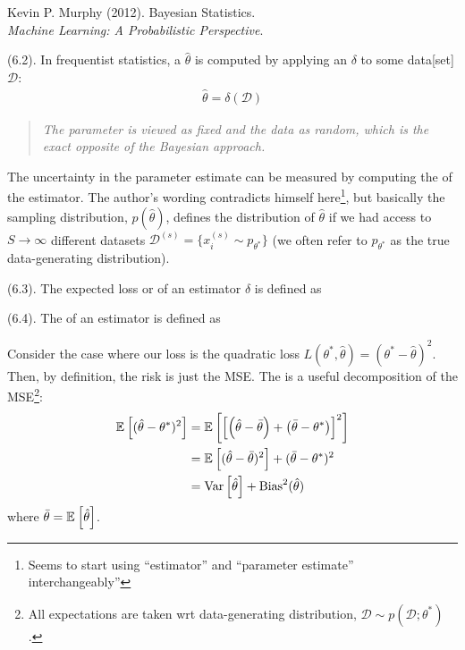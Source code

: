 \documentclass[11pt]{article}
\begin{document}

\vspace{-1.7em}
{\scriptsize Kevin P. Murphy (2012). Bayesian Statistics.\\ \textit{Machine Learning: A Probabilistic Perspective}.\\ }

 (6.2). In frequentist statistics, a  $\hat \theta$ is computed by applying an  $\delta$ to some data[set] $\mathcal D$:
\begin{align}
	\hat \theta = \delta(\mathcal D)
\end{align}
\begin{quote}
	\textit{The parameter is viewed as fixed and the data as random, which is the exact opposite of the Bayesian approach.}
\end{quote}
The uncertainty in the parameter estimate can be measured by computing the  of the estimator. The author's wording contradicts himself here\footnote{Seems to start using ``estimator'' and ``parameter estimate'' interchangeably''}, but basically the sampling distribution, $p(\hat \theta)$, defines the distribution of $\hat \theta$ if we had access to $S \rightarrow \infty$ different datasets $\mathcal{D}^{(s)} = \{x_i^{(s)} \sim p_{\theta^*}\}$ (we often refer to $p_{\theta^*}$ as the true data-generating distribution).  

 (6.3). The expected loss or  of an estimator $\delta$ is defined as


 (6.4). The  of an estimator is defined as

Consider the case where our loss is the quadratic loss $L(\theta^*, \hat{\theta}) = (\theta^* - \hat{\theta})^2$. Then, by definition, the risk is just the MSE. The  is a useful decomposition of the MSE\footnote{All expectations are taken wrt data-generating distribution, $\mathcal D \sim p(\mathcal D; \theta^*)$.}:
\begin{align}
	\mathbb{E}_{}\left[(\hat\theta -\theta^*)^2\right]
		&= \mathbb{E}_{}\left[\left[ \left(  \hat\theta - \bar\theta  \right) + \left(  \bar\theta - \theta^{*}   \right) \right]^2\right] \\
		&= \mathbb{E}_{}\left[(\hat\theta - \bar\theta)^2\right] + (\bar\theta - \theta^*)^2 \\
		&= \mathrm{Var}\left[\hat\theta\right] + \text{Bias}^2(\hat\theta)
\end{align}
where $\bar \theta = \mathbb{E}_{}\left[\hat\theta\right]$. 
\end{document}
